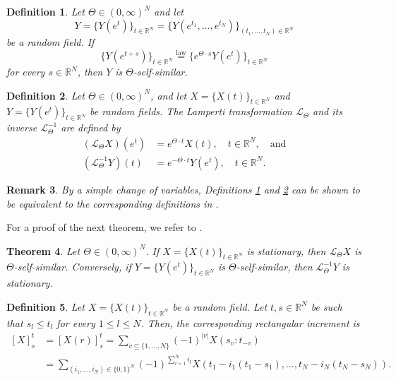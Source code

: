 \documentclass[english, a4paper, 12pt,reqno]{amsart}
\newtheorem{defi}{Definition}[section]
\newtheorem{theorem}[defi]{Theorem}
\newtheorem{rem}[defi]{Remark}
\begin{document}
\begin{defi}
\label{defi:self-similarity}
Let $\Theta\in (0,\infty)^N$ and let 
$$Y = \{Y(e^t)\}_{t\in\mathbb{R}^N} = \{Y(e^{t_1}, \dots, e^{t_N})\}_{(t_1,\dots,t_N)\in\mathbb{R}^N}$$
be a random field. If
$$\{Y(e^{t+s})\}_{t\in\mathbb{R}^N} \overset{\text{law}}{=} \{e^{\Theta\cdot s}Y(e^{t})\}_{t\in\mathbb{R}^N}$$
for every $s\in\mathbb{R}^N$, then $Y$ is $\Theta$-self-similar.
\end{defi}


\begin{defi}
\label{defi:lamperti}
Let $\Theta\in (0,\infty)^N$, and let $X=\{X(t)\}_{t\in\mathbb{R}^N}$ and $Y=\{Y(e^t)\}_{t\in\mathbb{R}^N}$ be random fields. The Lamperti transformation $\mathcal{L}_\Theta$ and its inverse $\mathcal{L}^{-1}_\Theta$ are defined by
\begin{align*}
(\mathcal{L}_\Theta X)(e^t) &= e^{\Theta\cdot t} X(t), \quad t\in\mathbb{R}^N, \quad \text{and}\\
(\mathcal{L}^{-1}_\Theta Y)(t) &= e^{-\Theta\cdot t} Y(e^t), \quad  t\in\mathbb{R}^N.
\end{align*}
\end{defi}

\begin{rem}
By a simple change of variables, Definitions \ref{defi:self-similarity} and \ref{defi:lamperti} can be shown to be equivalent to the corresponding definitions in \cite{genton2007self}.  
\end{rem}
For a proof of the next theorem, we refer to \cite{genton2007self}.
\begin{theorem}
\label{theorem:lamperti}
Let $\Theta\in (0,\infty)^N$. If $X=\{X(t)\}_{t\in\mathbb{R}^N}$ is stationary, then $\mathcal{L}_\Theta X$ is $\Theta$-self-similar. Conversely, if $Y=\{Y(e^t)\}_{t\in\mathbb{R}^N}$ is $\Theta$-self-similar, then $\mathcal{L}^{-1}_\Theta Y$ is stationary.
\end{theorem}

\begin{defi}
\label{defi:increments}
Let $X = \{X(t)\}_{t\in\mathbb{R}^N}$ be a random field. Let $t,s\in\mathbb{R}^N$ be such that $s_l \leq t_l$ for every $1\leq l \leq N$. Then, the corresponding rectangular increment is
\begin{equation}
\label{increments}
\begin{split}
\left[X\right]_s^t &= \left[X(r)\right]_s^t = \sum_{v\subseteq\{1,\dots,N\}} (-1)^{|v|} X(s_v:t_{-v}) \\
 &= \sum_{(i_1,\dots,i_N)\in\{0,1\}^N} (-1)^{\sum_{l=1}^N i_l} X(t_1-i_1(t_1-s_1),\dots,t_N-i_N(t_N-s_N)).\\
 \end{split}
 \end{equation}
\end{defi}
\end{document}
